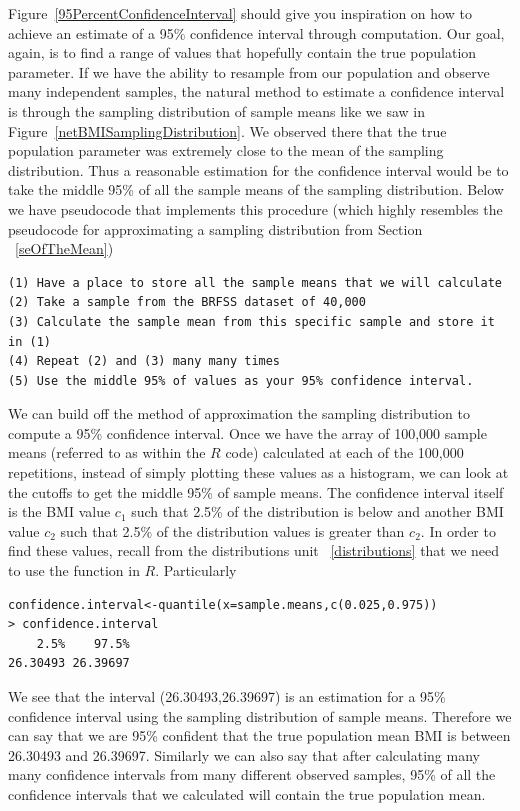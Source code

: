 Figure~\ref{95PercentConfidenceInterval} should give you inspiration on how to achieve an estimate of a 95\% confidence interval through computation. Our goal, again, is to find a range of values that hopefully contain the true population parameter. If we have the ability to resample from our population and observe many independent samples, the natural method to estimate a confidence interval is through the sampling distribution of sample means like we saw in Figure~\ref{netBMISamplingDistribution}. We observed there that the true population parameter was extremely close to the mean of the sampling distribution. Thus a reasonable estimation for the confidence interval would be to take the middle 95\% of all the sample means of the sampling distribution. Below we have pseudocode that implements this procedure (which highly resembles the pseudocode for approximating a sampling distribution from Section ~\ref{seOfTheMean})
\begin{verbatim}
(1) Have a place to store all the sample means that we will calculate
(2) Take a sample from the BRFSS dataset of 40,000
(3) Calculate the sample mean from this specific sample and store it in (1)
(4) Repeat (2) and (3) many many times 
(5) Use the middle 95% of values as your 95% confidence interval. 
\end{verbatim}

We can build off the method of approximation the sampling distribution to compute a 95\% confidence interval. Once we have the array of 100,000 sample means (referred to as  within the $R$ code) calculated at each of the 100,000 repetitions, instead of simply plotting these values as a histogram, we can look at the cutoffs to get the middle 95\% of sample means. The confidence interval itself is the BMI value  $c_1$ such that 2.5\% of the distribution is below and another BMI value $c_2$ such that 2.5\% of the distribution values is greater than $c_2$. In order to find these values, recall from the distributions unit ~\ref{distributions} that we need to use the  function in $R$. Particularly 
\begin{verbatim}
confidence.interval<-quantile(x=sample.means,c(0.025,0.975))
> confidence.interval
    2.5%    97.5% 
26.30493 26.39697 
\end{verbatim}
We see that the interval (26.30493,26.39697) is an estimation for a 95\% confidence interval using the sampling distribution of sample means. Therefore we can say that we are 95\% confident that the true population mean BMI is between 26.30493 and 26.39697. Similarly we can also say that after calculating many many confidence intervals from many different observed samples, 95\% of all the confidence intervals that we calculated will contain the true population mean. 

